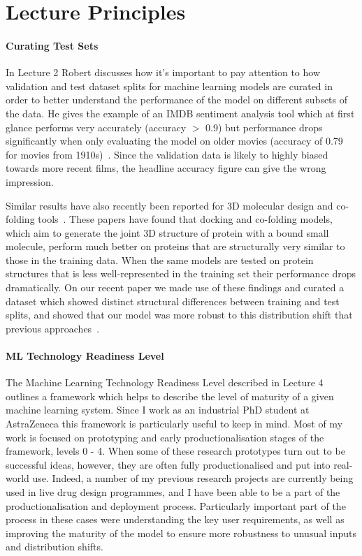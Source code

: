 \documentclass{article}
\begin{document}
\section{Lecture Principles}

\paragraph{Curating Test Sets}

In Lecture 2 Robert discusses how it's important to pay attention to how validation and test dataset splits for machine learning models are curated in order to better understand the performance of the model on different subsets of the data. He gives the example of an IMDB sentiment analysis tool which at first glance performs very accurately (accuracy $>$ 0.9) but performance drops significantly when only evaluating the model on older movies (accuracy of 0.79 for movies from 1910s)~\cite{imdb-sentiment}. Since the validation data is likely to highly biased towards more recent films, the headline accuracy figure can give the wrong impression.

Similar results have also recently been reported for 3D molecular design and co-folding tools~\cite{posebusters,runsnposes}. These papers have found that docking and co-folding models, which aim to generate the joint 3D structure of protein with a bound small molecule, perform much better on proteins that are structurally very similar to those in the training data. When the same models are tested on protein structures that is less well-represented in the training set their performance drops dramatically. On our recent paper we made use of these findings and curated a dataset which showed distinct structural differences between training and test splits, and showed that our model was more robust to this distribution shift that previous approaches~\cite{flowr}.


\paragraph{ML Technology Readiness Level}

The Machine Learning Technology Readiness Level described in Lecture 4 outlines a framework which helps to describe the level of maturity of a given machine learning system. Since I work as an industrial PhD student at AstraZeneca this framework is particularly useful to keep in mind. Most of my work is focused on prototyping and early productionalisation stages of the framework, levels 0 - 4. When some of these research prototypes turn out to be successful ideas, however, they are often fully productionalised and put into real-world use. Indeed, a number of my previous research projects are currently being used in live drug design programmes, and I have been able to be a part of the productionalisation and deployment process. Particularly important part of the process in these cases were understanding the key user requirements, as well as improving the maturity of the model to ensure more robustness to unusual inputs and distribution shifts.
\end{document}
